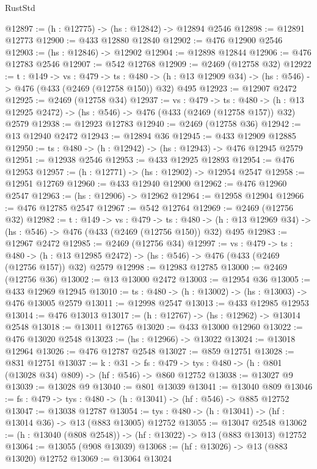 \begin{lexlean}{RustStd}
\begin{coremodule}
@12897 := (h : @12775) -> (hs : @12842) -> @12894 @2546
@12898 := @12891 @12773
@12900 := @433 @12880 @12840
@12902 := @476 @12900 @2546
@12903 := (hs : @12846) -> @12902
@12904 := @12898 @12844
@12906 := @476 @12783 @2546
@12907 := @542 @12768
@12909 := @2469 (@12758 @32)
@12922 := {t : @149} ->
  {vs : @479} ->
  {ts : @480} -> (h : @13 @12909 @34) -> (hs : @546) -> @476 (@433 (@2469 (@12758 @150)) @32) @495
@12923 := @12907 @2472
@12925 := @2469 (@12758 @34)
@12937 := {vs : @479} ->
  {ts : @480} ->
  (h : @13 @12925 @2472) -> (hs : @546) -> @476 (@433 (@2469 (@12758 @157)) @32) @2579
@12938 := @12923 @12783
@12940 := @2469 (@12758 @36)
@12942 := @13 @12940 @2472
@12943 := @12894 @36
@12945 := @433 @12909 @12885
@12950 := {ts : @480} -> (h : @12942) -> (hs : @12943) -> @476 @12945 @2579
@12951 := @12938 @2546
@12953 := @433 @12925 @12893
@12954 := @476 @12953
@12957 := (h : @12771) -> (hs : @12902) -> @12954 @2547
@12958 := @12951 @12769
@12960 := @433 @12940 @12900
@12962 := @476 @12960 @2547
@12963 := (hs : @12906) -> @12962
@12964 := @12958 @12904
@12966 := @476 @12785 @2547
@12967 := @542 @12764
@12969 := @2469 (@12756 @32)
@12982 := {t : @149} ->
  {vs : @479} ->
  {ts : @480} -> (h : @13 @12969 @34) -> (hs : @546) -> @476 (@433 (@2469 (@12756 @150)) @32) @495
@12983 := @12967 @2472
@12985 := @2469 (@12756 @34)
@12997 := {vs : @479} ->
  {ts : @480} ->
  (h : @13 @12985 @2472) -> (hs : @546) -> @476 (@433 (@2469 (@12756 @157)) @32) @2579
@12998 := @12983 @12785
@13000 := @2469 (@12756 @36)
@13002 := @13 @13000 @2472
@13003 := @12954 @36
@13005 := @433 @12969 @12945
@13010 := {ts : @480} -> (h : @13002) -> (hs : @13003) -> @476 @13005 @2579
@13011 := @12998 @2547
@13013 := @433 @12985 @12953
@13014 := @476 @13013
@13017 := (h : @12767) -> (hs : @12962) -> @13014 @2548
@13018 := @13011 @12765
@13020 := @433 @13000 @12960
@13022 := @476 @13020 @2548
@13023 := (hs : @12966) -> @13022
@13024 := @13018 @12964
@13026 := @476 @12787 @2548
@13027 := @859 @12751
@13028 := @831 @12751
@13037 := {k : @31} ->
  {fs : @479} -> {tys : @480} -> (h : @801 (@13028 @34) @809) -> (hf : @546) -> @860 @12752
@13038 := @13027 @9
@13039 := @13028 @9
@13040 := @801 @13039
@13041 := @13040 @809
@13046 := {fs : @479} -> {tys : @480} -> (h : @13041) -> (hf : @546) -> @885 @12752
@13047 := @13038 @12787
@13054 := {tys : @480} -> (h : @13041) -> (hf : @13014 @36) -> @13 (@883 @13005) @12752
@13055 := @13047 @2548
@13062 := (h : @13040 (@808 @2548)) -> (hf : @13022) -> @13 (@883 @13013) @12752
@13064 := @13055 (@908 @13039)
@13068 := (hf : @13026) -> @13 (@883 @13020) @12752
@13069 := @13064 @13024

\end{coremodule}
\end{lexlean}
